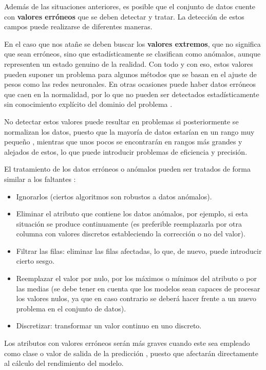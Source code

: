 Además de las situaciones anteriores, es posible que el conjunto de datos cuente con \textbf{valores erróneos} que 
se deben detectar y tratar.
La detección de estos campos puede realizarse de diferentes maneras.

En el caso que nos atañe se deben buscar los \textbf{valores extremos}, que no significa que sean erróneos, sino que 
estadísticamente se clasifican como anómalos, aunque representen un estado genuino de la realidad.
Con todo y con eso, estos valores pueden suponer un problema para algunos métodos que se basan en el ajuste de pesos
como las redes neuronales.
En otras ocasiones puede haber datos erróneos que caen en la normalidad, por lo que no pueden ser detectados estadísticamente sin 
conocimiento explícito del dominio del problema \cite{book:hernandez2004}.

No detectar estos valores puede resultar en problemas si posteriormente se normalizan los datos, puesto
que la mayoría de datos estarían en un rango muy pequeño \cite{book:hernandez2004}, mientras que unos pocos 
se encontrarán en rangos más grandes y alejados de estos, lo que puede introducir problemas de eficiencia y precisión.

El tratamiento de los datos erróneos o anómalos pueden ser tratados de forma similar a los faltantes \cite{book:hernandez2004}:
\begin{itemize}
    \item Ignorarlos (ciertos algoritmos son robustos a datos anómalos).
    \item Eliminar el atributo que contiene los datos anómalos, por ejemplo, si esta situación se produce
        continuamente (es preferible reemplazarla por otra columna con valores discretos
        estableciendo la corrección o no del valor).
    \item Filtrar las filas: eliminar las filas afectadas, lo que, de nuevo, puede introducir cierto sesgo.
    \item Reemplazar el valor por nulo, por los máximos o mínimos del atributo o por
        las medias (se debe tener en cuenta que los modelos sean capaces de procesar los valores
        nulos, ya que en caso contrario se deberá hacer frente a un nuevo problema en el conjunto
        de datos).
    \item Discretizar: transformar un valor continuo en uno discreto.
\end{itemize}
Los atributos con valores erróneos serán más graves cuando este sea empleado como clase o valor de salida de la predicción \cite{book:hernandez2004},
puesto que afectarán directamente al cálculo del rendimiento del modelo. 

